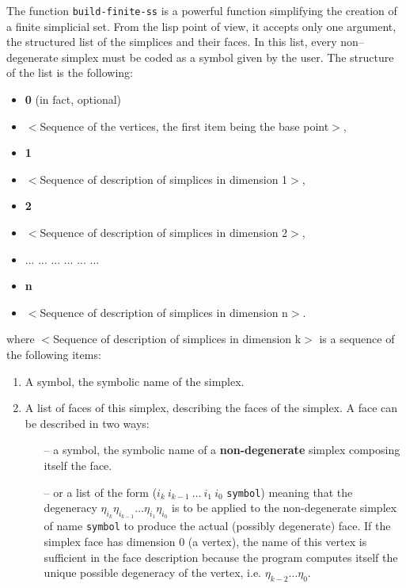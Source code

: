 The function {\tt build-finite-ss} 
is a powerful function simplifying the creation of a finite
simplicial set. From the lisp point of view, it accepts only one argument, the structured list
of the simplices and their faces. In this list, every non--degenerate simplex must
be coded as a symbol given by the user.  The  structure of the list is the following:
\begin{itemize}
\item {\bf 0}    (in fact, optional)
\item $<$Sequence of the vertices, the first item being the base point$>$,
\item {\bf 1}
\item $<$Sequence of description of simplices in dimension 1$>$,
\item {\bf 2}
\item $<$Sequence of description of simplices in dimension 2$>$,
\item   ... ... ... ... ... ...
\item {\bf n}
\item $<$Sequence of description of simplices in dimension n$>$.
\end{itemize}
where $<$Sequence of description of simplices in dimension k$>$ is a sequence of
the following items:
\begin{enumerate}
\item A symbol, the symbolic name of the simplex.
\item A list of  faces of this simplex, describing the faces of the simplex.
A face can be described in two ways:
\begin{itemize}
\item [--] a symbol, the symbolic name of a {\bf non-degenerate} simplex composing itself the
face.
\item [--] or a list of the form  ($i_k\ i_{k-1}\ \ldots \ i_1 \ i_0$ {\tt symbol}) meaning that the degeneracy
$\eta_{i_k}\eta_{i_{k-1}}\ldots\eta_{i_1}\eta_{i_0}$ is to be applied to the non-degenerate simplex
of name {\tt symbol}  to produce the actual (possibly degenerate) face. If the simplex face has dimension $0$ (a vertex), 
the name of this vertex is sufficient in the
face description because the program computes itself
the unique possible degeneracy of the vertex, i.e. $\eta_{k-2}\ldots\eta_0$. 
\end{itemize}

\end{enumerate}

